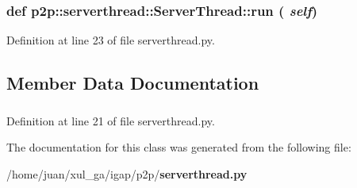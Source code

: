\subsubsection{\setlength{\rightskip}{0pt plus 5cm}def p2p::serverthread::ServerThread::run ( {\em self})}\label{classp2p_1_1serverthread_1_1ServerThread_37c8312d855baa5fbca3c2912924d28c}




Definition at line 23 of file serverthread.py.

\subsection{Member Data Documentation}
\subsubsection{}\label{classp2p_1_1serverthread_1_1ServerThread_946b419843190364e9cacf4c4448487e}




Definition at line 21 of file serverthread.py.

The documentation for this class was generated from the following file:\begin{CompactItemize}
\item 
/home/juan/xul\_\-ga/igap/p2p/{\bf serverthread.py}\end{CompactItemize}
